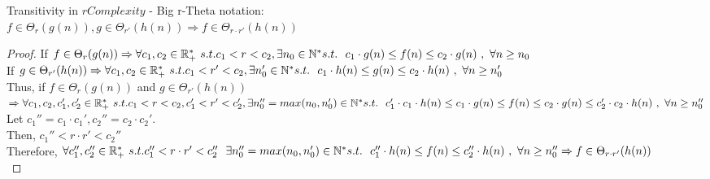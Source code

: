 \begin{theorem} Transitivity in $rComplexity$ - Big r-Theta notation:  \\  $ f \in \Theta_{r}(g(n)),  g \in \Theta_{r'}(h(n)) \Rightarrow  f \in \Theta_{r \cdot r'}(h(n))$    
\end{theorem} 
\begin{proof} 
	If $ f \in \Theta_{r}(g(n)) \Rightarrow \forall c_{1}, c_{2} \in \mathbb{R}^{*}_{+} \ s.t.  c_{1}< r < c_{2} , \exists n_{0} \in \mathbb{N}^{*}\ \\ s.t.\ \ c_{1} \cdot g(n) \leq f(n) \leq c_{2} \cdot g(n)\ ,\  \forall n \geq n_{0} $ \\
	If $ g \in \Theta_{r'}(h(n)) \Rightarrow \forall c_{1}, c_{2} \in \mathbb{R}^{*}_{+} \ s.t.  c_{1} < r' < c_{2} , \exists n_{0}' \in \mathbb{N}^{*}\ \\ s.t.\ \ c_{1} \cdot h(n) \leq g(n) \leq c_{2} \cdot h(n)\ ,\  \forall n \geq n_{0}' $ \\
	Thus, if $ f \in \Theta_{r}(g(n))$ and $ g \in \Theta_{r'}(h(n))$ \\ $\Rightarrow \forall c_{1}, c_{2}, c_{1}', c_{2}' \in \mathbb{R}^{*}_{+} \ s.t.  c_{1} < r < c_{2}, c_{1}' < r' < c_{2}' , \exists n''_{0}=max(n_{0}, n'_{0}) \in \mathbb{N}^{*}\ \\ s.t.\ \ c_{1}' \cdot c_{1} \cdot h(n) \leq c_{1} \cdot g(n) \leq f(n) \leq c_{2} \cdot g(n) \leq c_{2}' \cdot c_{2} \cdot h(n)\ ,\  \forall n \geq n''_{0} $ \\
	Let $c_{1}'' = c_{1} \cdot c_{1}' , c_{2}'' = c_{2} \cdot c_{2}'$. \\
	Then, $c_{1}'' < r \cdot r' < c_{2}''$ \\ 
	Therefore, $\forall c_{1}'', c_{2}'' \in \mathbb{R}^{*}_{+} \ s.t.  c_{1}'' < r \cdot r' < c_{2}'' \ \ \exists n''_{0}=max(n_{0}, n'_{0}) \in \mathbb{N}^{*}\ \\ s.t.\ \ c_{1}'' \cdot h(n) \leq f(n) \leq c_{2}'' \cdot h(n)\ ,\  \forall n \geq n''_{0} \Rightarrow f \in \Theta_{r \cdot r'}(h(n))$ \\

\end{proof}

